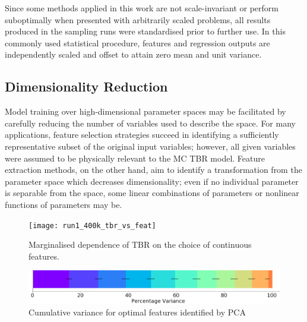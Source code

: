 Since some methods applied in this work are not scale-invariant or
perform suboptimally when presented with arbitrarily scaled problems, all results
produced in the sampling runs were standardised prior to further use. In this
commonly used statistical procedure, features and regression outputs are
independently scaled and offset to attain zero mean and unit variance.



\subsection{Dimensionality Reduction}
\label{sec:dimred}

Model training over high-dimensional parameter spaces may be facilitated by carefully reducing the number of variables used to describe the space. For many applications, feature selection strategies succeed in identifying a sufficiently representative subset of the original input variables; however, all given variables were assumed to be physically relevant to the MC TBR model. Feature extraction methods, on the other hand, aim to identify a transformation from the parameter space which decreases dimensionality; even if no individual parameter is separable from the space, some linear combinations of parameters or nonlinear functions of parameters may be.

\begin{figure}[h]
	\centering
	\texttt{[image: run1\_400k\_tbr\_vs\_feat]}
	\caption{Marginalised dependence of TBR on the choice of continuous
	features.}
  \label{fig:tbr-vs-features}
\end{figure}

\begin{figure}[h]
  \centering
    \includegraphics[width=0.6\linewidth]{fig2_pca.jpg}
    \caption{Cumulative variance for optimal features identified by PCA}
  \label{fig:pca}
\end{figure}

